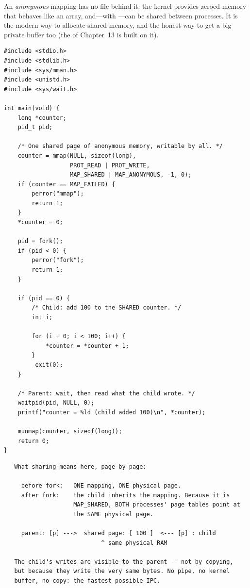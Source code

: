An \emph{anonymous} mapping has no file behind it: the kernel provides
zeroed memory that behaves like an array, and---with
---can be shared between processes. It is the
modern way to allocate shared memory, and the honest way to get a
big private buffer too (the  of Chapter~13 is built on
it).

\begin{lstlisting}[caption={A shared counter visible to a forked child.}]
#include <stdio.h>
#include <stdlib.h>
#include <sys/mman.h>
#include <unistd.h>
#include <sys/wait.h>

int main(void) {
    long *counter;
    pid_t pid;

    /* One shared page of anonymous memory, writable by all. */
    counter = mmap(NULL, sizeof(long),
                   PROT_READ | PROT_WRITE,
                   MAP_SHARED | MAP_ANONYMOUS, -1, 0);
    if (counter == MAP_FAILED) {
        perror("mmap");
        return 1;
    }
    *counter = 0;

    pid = fork();
    if (pid < 0) {
        perror("fork");
        return 1;
    }

    if (pid == 0) {
        /* Child: add 100 to the SHARED counter. */
        int i;

        for (i = 0; i < 100; i++) {
            *counter = *counter + 1;
        }
        _exit(0);
    }

    /* Parent: wait, then read what the child wrote. */
    waitpid(pid, NULL, 0);
    printf("counter = %ld (child added 100)\n", *counter);

    munmap(counter, sizeof(long));
    return 0;
}
\end{lstlisting}

\begin{verbatim}
   What sharing means here, page by page:

     before fork:   ONE mapping, ONE physical page.
     after fork:    the child inherits the mapping. Because it is
                    MAP_SHARED, BOTH processes' page tables point at
                    the SAME physical page.

     parent: [p] --->  shared page: [ 100 ]  <--- [p] : child
                            ^ same physical RAM

   The child's writes are visible to the parent -- not by copying,
   but because they write the very same bytes. No pipe, no kernel
   buffer, no copy: the fastest possible IPC.
\end{verbatim}

